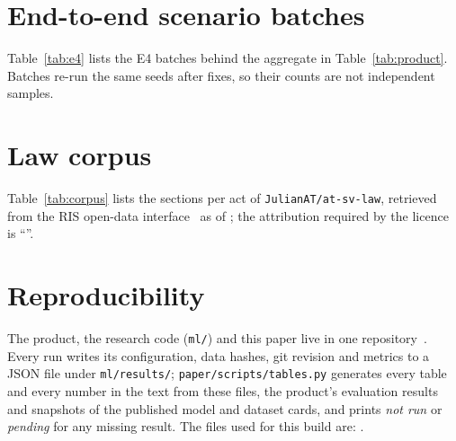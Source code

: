 \documentclass[10pt]{article}
\begin{document}


\section{End-to-end scenario batches}
\label{app:e4}



Table~\ref{tab:e4} lists the E4 batches behind the aggregate in Table~\ref{tab:product}. Batches
re-run the same seeds after fixes, so their counts are not independent samples.

\section{Law corpus}
\label{app:corpus}



Table~\ref{tab:corpus} lists the sections per act of \nolinkurl{JulianAT/at-sv-law}, retrieved from
the RIS open-data interface~\citep{ris-ogd} as of \CorpusAsOf{}; the attribution required by the
licence is ``\DataLawAttribution''.

\section{Reproducibility}
\label{app:repro}

The product, the research code (\texttt{ml/}) and this paper live in one
repository~\citep{sv-lotse-prd}. Every run writes its configuration, data hashes, git revision and
metrics to a JSON file under \texttt{ml/results/}; \texttt{paper/scripts/tables.py} generates every
table and every number in the text from these files, the product's evaluation results and snapshots
of the published model and dataset cards, and prints \emph{not run} or \emph{pending} for any
missing result. \StatusResearch{} \StatusAgents{} The files used for this build are: \StatusFiles.


\end{document}
